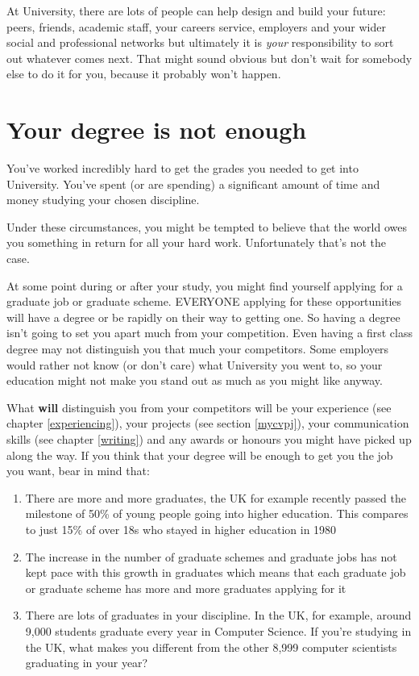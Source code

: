 \documentclass[
]{book}
\providecommand{\tightlist}{%
  \setlength{\itemsep}{0pt}\setlength{\parskip}{0pt}}
\begin{document}
At University, there are lots of people can help design and build your future: peers, friends, academic staff, your careers service, employers and your wider social and professional networks but ultimately it is \emph{your} responsibility to sort out whatever comes next. That might sound obvious but don't wait for somebody else to do it for you, because it probably won't happen.

\hypertarget{entitled}{%
\section{Your degree is not enough}\label{entitled}}

You've worked incredibly hard to get the grades you needed to get into University. You've spent (or are spending) a significant amount of time and money studying your chosen discipline.

Under these circumstances, you might be tempted to believe that the world owes you something in return for all your hard work. Unfortunately that's not the case.

At some point during or after your study, you might find yourself applying for a graduate job or graduate scheme. EVERYONE applying for these opportunities will have a degree or be rapidly on their way to getting one. So having a degree isn't going to set you apart much from your competition. Even having a first class degree \citep{gradeinflation, firstclass} may not distinguish you that much your competitors. Some employers would rather not know (or don't care) what University you went to, so your education might not make you stand out as much as you might like anyway. \citep{bigfour, eyfirm}

What \textbf{will} distinguish you from your competitors will be your experience (see chapter \ref{experiencing}), your projects (see section \ref{mycvpj}), your communication skills (see chapter \ref{writing}) and any awards or honours you might have picked up along the way. If you think that your degree will be enough to get you the job you want, bear in mind that:

\begin{enumerate}
\def\labelenumi{\arabic{enumi}.}
\tightlist
\item
  There are more and more graduates, the UK for example recently passed the milestone of 50\% of young people going into higher education. This compares to just 15\% of over 18s who stayed in higher education in 1980 \citep{lotsofgrads}
\item
  The increase in the number of graduate schemes and graduate jobs has not kept pace with this growth in graduates which means that each graduate job or graduate scheme has more and more graduates applying for it
\item
  There are lots of graduates in your discipline. In the UK, for example, around 9,000 students graduate every year in Computer Science. If you're studying in the UK, what makes you different from the other 8,999 computer scientists graduating in your year?
\end{enumerate}
\end{document}
